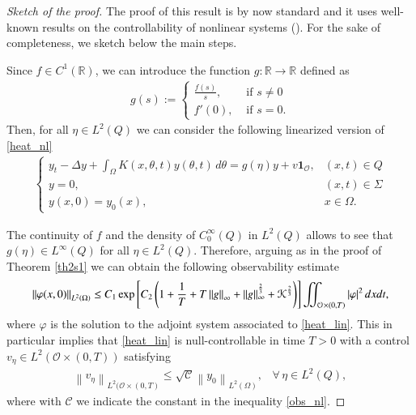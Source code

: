 \documentclass[preprint,1p]{elsarticle}
\newcommand{\D}{\displaystyle}
\newcommand{\norm}[2]{\left\|#1\right\|_{#2}}
\newcommand{\R}{\mathbb{R}}
\newcommand{\intd}{\displaystyle\int \kern -7pt \int}
\begin{document}
\begin{proof}[Sketch of the proof]
The proof of this result is by now standard and it uses well-known results on the controllability of nonlinear systems (\cite{fabre1995approximate,fernandez1999approximate,fernandez1997null,zuazua1991exact}). For the sake of completeness, we sketch below the main steps. 	
	
Since $f\in C^1(\R)$, we can introduce the function $g:\R\to\R$ defined as
\begin{align*}
	g(s):=\begin{cases}
		\displaystyle \frac{f(s)}{s}, & \textrm{ if } s\neq 0
		\\[6pt]
		f'(0), & \textrm{ if } s=0.
	\end{cases}	
\end{align*}
Then, for all $\eta\in L^2(Q)$ we can consider the following linearized version of \eqref{heat_nl}
\begin{align}\label{heat_lin}
	\begin{cases}
		\D y_t - \Delta y + \int_\Omega K(x,\theta,t)y(\theta,t)\,d\theta = g(\eta)y + v\mathbf{1}_{\mathcal O}, & (x,t)\in Q
		\\
		y = 0, & (x,t)\in\Sigma
		\\
		y(x,0) = y_0(x), & x\in\Omega.
	\end{cases}
\end{align}
	
The continuity of $f$ and the density of $C_0^\infty(Q)$ in $L^2(Q)$ allows to see that $g(\eta)\in L^\infty(Q)$ for all $\eta\in L^2(Q)$. Therefore, arguing as in the proof of Theorem \ref{th2s1} we can obtain the following observability estimate 
\begin{align}\label{obs_nl}
	\norm{\varphi(x,0)}{L^2(\Omega)}\leq C_1\exp\left[C_2\left(1 + \frac 1T + T\norm{g}{\infty} + \norm{g}{\infty}^{\frac 23} + \mathcal K^{\frac 23}\right)\right] \intd_{\mathcal O\times(0,T)} |\varphi|^2\,dxdt, 
\end{align}
where $\varphi$ is the solution to the adjoint system associated to \eqref{heat_lin}. This in particular implies that \eqref{heat_lin} is null-controllable in time $T>0$ with a control $v_\eta\in L^2(\mathcal O\times(0,T))$ satisfying
\begin{align*}
	\norm{v_\eta}{L^2(\mathcal O\times(0,T)}\leq\sqrt{\mathcal C}\norm{y_0}{L^2(\Omega)}, \;\;\; \forall\,\eta\in L^2(Q),
\end{align*}
where with $\mathcal C$ we indicate the constant in the inequality \eqref{obs_nl}. 
	

\end{proof}
\end{document}
